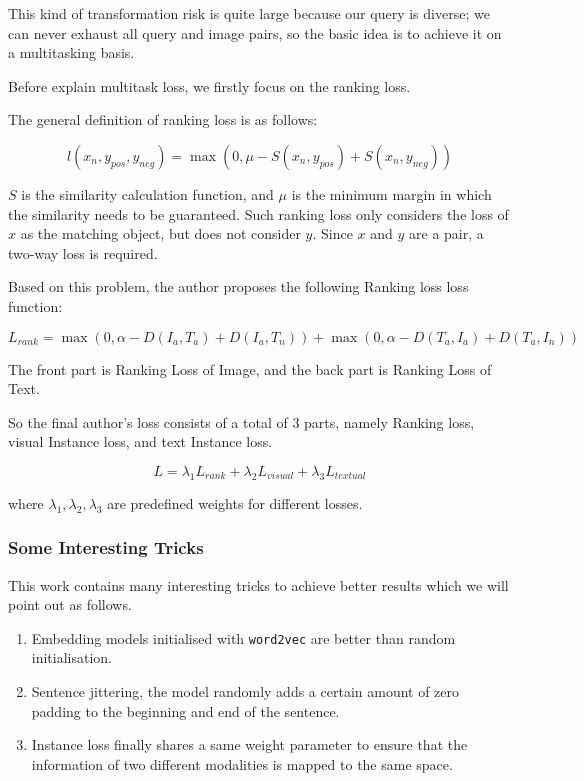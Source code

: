 This kind of transformation risk is quite large because our query is diverse; we can never exhaust all query and image pairs, so the basic idea is to achieve it on a multitasking basis.

Before explain multitask loss, we firstly focus on the ranking loss.

The general definition of ranking loss is as follows:

$$
l\left(x_{n}, y_{p o s}, y_{n e g}\right)=\max \left(0, \mu-S\left(x_{n}, y_{p o s}\right)+S\left(x_{n}, y_{n e g}\right)\right)
$$

$S$ is the similarity calculation function, and $\mu$ is the minimum margin in which the similarity needs to be guaranteed. Such ranking loss only considers the loss of $x$ as the matching object, but does not consider $y$. Since $x$ and $y$ are a pair, a two-way loss is required.

Based on this problem, the author proposes the following Ranking loss loss function:

$$
L_{r a n k}=\max \left(0, \alpha-D\left(I_{a}, T_{a}\right)+D\left(I_{a}, T_{n}\right)\right)+\max \left(0, \alpha-D\left(T_{a}, I_{a}\right)+D\left(T_{a}, I_{n}\right)\right)
$$

The front part is Ranking Loss of Image, and the back part is Ranking Loss of Text.

So the final author's loss consists of a total of 3 parts, namely Ranking loss, visual Instance loss, and text Instance loss.

$$
L=\lambda_{1} L_{r a n k}+\lambda_{2} L_{v i s u a l}+\lambda_{3} L_{t e x t u a l}
$$

where $\lambda_{1}, \lambda_{2}, \lambda_{3}$ are predefined weights for different losses.

\subsubsection{Some Interesting Tricks}
This work contains many interesting tricks to achieve better results which we will point out as follows.

\begin{enumerate}
    \item Embedding models initialised with \verb|word2vec| are better than random initialisation.
    \item Sentence jittering, the model randomly adds a certain amount of zero padding to the beginning and end of the sentence.
    \item Instance loss finally shares a same weight parameter to ensure that the information of two different modalities is mapped to the same space.
\end{enumerate}

